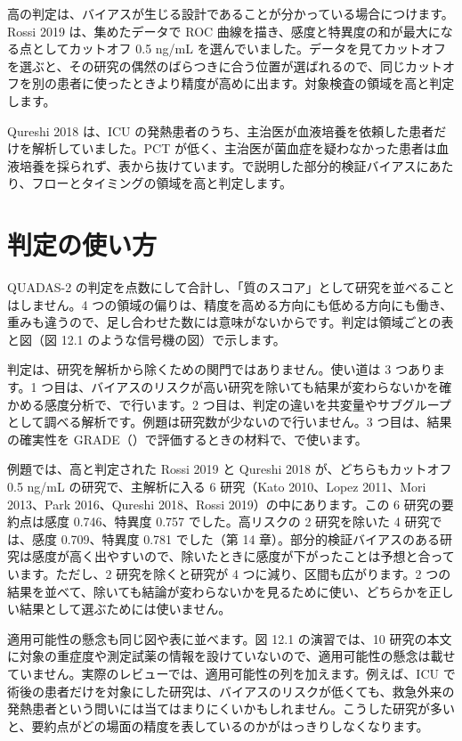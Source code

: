 高の判定は、バイアスが生じる設計であることが分かっている場合につけます。Rossi 2019 は、集めたデータで ROC 曲線を描き、感度と特異度の和が最大になる点としてカットオフ 0.5 ng/mL を選んでいました。データを見てカットオフを選ぶと、その研究の偶然のばらつきに合う位置が選ばれるので、同じカットオフを別の患者に使ったときより精度が高めに出ます。対象検査の領域を高と判定します。

Qureshi 2018 は、ICU の発熱患者のうち、主治医が血液培養を依頼した患者だけを解析していました。PCT が低く、主治医が菌血症を疑わなかった患者は血液培養を採られず、表から抜けています。で説明した部分的検証バイアスにあたり、フローとタイミングの領域を高と判定します。

\section{判定の使い方}
\label{sec:12-8}

QUADAS-2 の判定を点数にして合計し、「質のスコア」として研究を並べることはしません。4 つの領域の偏りは、精度を高める方向にも低める方向にも働き、重みも違うので、足し合わせた数には意味がないからです。判定は領域ごとの表と図（図 12.1 のような信号機の図）で示します。

判定は、研究を解析から除くための関門ではありません。使い道は 3 つあります。1 つ目は、バイアスのリスクが高い研究を除いても結果が変わらないかを確かめる感度分析で、で行います。2 つ目は、判定の違いを共変量やサブグループとして調べる解析です。例題は研究数が少ないので行いません。3 つ目は、結果の確実性を GRADE（）で評価するときの材料で、で使います。

例題では、高と判定された Rossi 2019 と Qureshi 2018 が、どちらもカットオフ 0.5 ng/mL の研究で、主解析に入る 6 研究（Kato 2010、Lopez 2011、Mori 2013、Park 2016、Qureshi 2018、Rossi 2019）の中にあります。この 6 研究の要約点は感度 0.746、特異度 0.757 でした。高リスクの 2 研究を除いた 4 研究では、感度 0.709、特異度 0.781 でした（第 14 章）。部分的検証バイアスのある研究は感度が高く出やすいので、除いたときに感度が下がったことは予想と合っています。ただし、2 研究を除くと研究が 4 つに減り、区間も広がります。2 つの結果を並べて、除いても結論が変わらないかを見るために使い、どちらかを正しい結果として選ぶためには使いません。

適用可能性の懸念も同じ図や表に並べます。図 12.1 の演習では、10 研究の本文に対象の重症度や測定試薬の情報を設けていないので、適用可能性の懸念は載せていません。実際のレビューでは、適用可能性の列を加えます。例えば、ICU で術後の患者だけを対象にした研究は、バイアスのリスクが低くても、救急外来の発熱患者という問いには当てはまりにくいかもしれません。こうした研究が多いと、要約点がどの場面の精度を表しているのかがはっきりしなくなります。


